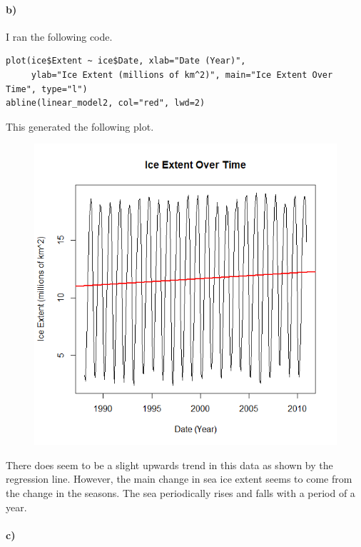 \documentclass[12pt]{article}
\begin{document}
\paragraph{b)}

I ran the following code.
\scriptsize
\begin{verbatim}
plot(ice$Extent ~ ice$Date, xlab="Date (Year)",
     ylab="Ice Extent (millions of km^2)", main="Ice Extent Over Time", type="l")
abline(linear_model2, col="red", lwd=2)
\end{verbatim}
\normalsize
This generated the following plot.
\begin{figure}[H]
    \begin{center}
        \includegraphics[width=4.5in]{exercise2b.png}
    \end{center}
\end{figure}
There does seem to be a slight upwards trend in this data as shown by the regression line.
However, the main change in sea ice extent seems to come from the change in the seasons. The
sea periodically rises and falls with a period of a year.

\paragraph{c)}
\end{document}
